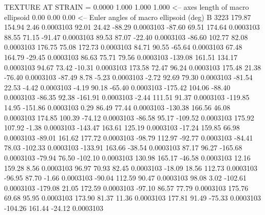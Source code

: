 TEXTURE AT STRAIN =    0.0000
   1.000   1.000   1.000  <-- axes length of macro ellipsoid
    0.00    0.00    0.00  <-- Euler angles of macro ellipsoid (deg)
B      3223
      179.87      154.94        2.46     0.0003103
       92.01       24.42      -88.29     0.0003103
      -87.60       69.51      174.64     0.0003103
       88.55       71.15      -91.47     0.0003103
       89.53       87.07      -22.40     0.0003103
      -86.60      102.77       82.08     0.0003103
      176.75       75.08      172.73     0.0003103
       84.71       90.55      -65.64     0.0003103
       67.48      164.79      -29.45     0.0003103
       86.63       75.71       79.56     0.0003103
     -139.08      161.51      134.17     0.0003103
       94.67       73.42      -10.31     0.0003103
      173.58       72.47       96.24     0.0003103
      175.48       21.38      -76.40     0.0003103
      -87.49        8.78       -5.23     0.0003103
       -2.72       92.69       79.30     0.0003103
      -81.54       22.53       -4.42     0.0003103
       -4.19       90.18      -65.40     0.0003103
     -175.42      104.06      -88.40     0.0003103
      -86.35       92.38     -161.91     0.0003103
       -2.44      111.51       91.37     0.0003103
     -119.85       14.95     -151.86     0.0003103
        0.29       86.49       77.44     0.0003103
     -130.38      166.56       46.08     0.0003103
      174.85      100.39      -74.12     0.0003103
      -86.58       95.17     -109.52     0.0003103
      175.92      107.92       -1.38     0.0003103
     -143.47      163.61      125.19     0.0003103
      -17.24      159.85       66.98     0.0003103
      -89.01      161.62      177.72     0.0003103
      -98.79      112.97      -92.77     0.0003103
      -84.41       78.03     -102.33     0.0003103
     -133.91      163.66      -38.54     0.0003103
       87.17       96.27     -165.68     0.0003103
      -79.94       76.50     -102.10     0.0003103
      130.98      165.17      -46.58     0.0003103
       12.16      159.28        8.56     0.0003103
       96.97       70.93       82.45     0.0003103
      -18.09       18.56      112.73     0.0003103
      -96.95       87.70       -1.66     0.0003103
      -90.04      112.59       90.47     0.0003103
       98.08        3.02     -102.61     0.0003103
     -179.08       21.05      172.59     0.0003103
      -97.10       86.57       77.79     0.0003103
      175.76       69.68       95.95     0.0003103
      173.90       81.37       11.36     0.0003103
      177.81       91.49      -75.33     0.0003103
     -104.26      161.44      -24.12     0.0003103

